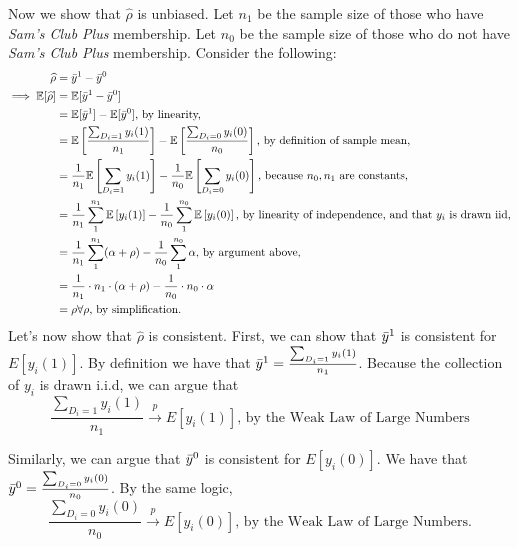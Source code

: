 \documentclass{article}
\newcommand{\E}{\mathbb{E}}
\begin{document}
\begin{enumerate}[label=\textbf{Q\arabic{enumi}}.,ref=Q\arabic{enumi}, wide=0pt, itemsep=1em, topsep=5pt]
\begin{enumerate}
\begin{solution}
{            Now we show that $\widehat{\rho}$ is unbiased. Let $n_1$ be the sample size of those who have \textit{Sam's Club Plus} membership. Let $n_0$ be the sample size of those who do not have \textit{Sam's Club Plus} membership. Consider the following:
            \begin{align*}
                \widehat{\rho} &= \Bar{y}^1 - \Bar{y}^0\\
                \implies \E[\widehat{\rho}] &= \E[\Bar{y}^1 - \Bar{y}^0] \\ 
                &= \E[\Bar{y}^1] - \E[\Bar{y}^0] \text{, by linearity, }\\
                &= \E\left[\frac{\sum_{D_i=1} y_i(1)}{n_1}\right] - \E\left[\frac{\sum_{D_i=0} y_i(0)}{n_0}\right] \text{, by definition of sample mean, }\\ 
                &= \frac{1}{n_1}\E\left[\sum_{D_i=1} y_i(1)\right] - \frac{1}{n_0}\E\left[\sum_{D_i=0} y_i(0)\right] \text{, because $n_0, n_1$ are constants, }\\ 
                &= \frac{1}{n_1}\sum_{1}^{n_1}\E\left[y_i(1)\right] - \frac{1}{n_0}\sum_{1}^{n_0}\E\left[y_i(0)\right] \text{, by linearity of independence, and that $y_i$ is drawn iid,}\\ 
                &= \frac{1}{n_1}\sum_{1}^{n_1} (\alpha + \rho) - \frac{1}{n_0}\sum_{1}^{n_0} \alpha \text{, by argument above, }\\ 
                &= \frac{1}{n_1}\cdot n_1 \cdot (\alpha + \rho) - \frac{1}{n_0} \cdot n_0 \cdot \alpha \\ 
                &= \rho \forall \rho \text{, by simplification}.
            \end{align*}
            \newpage
            Let's now show that $\hat{\rho}$ is consistent. 
            First, we can show that $\Bar{y}^1$ is consistent for $E[y_i(1)]$. By definition we have that $\Bar{y}^1 = \frac{\sum_{D_i=1} y_i(1)}{n_1}$. Because the collection of $y_i$ is drawn i.i.d, we can argue that 
            $$\frac{\sum_{D_i=1} y_i(1)}{n_1} \xrightarrow{p} E[y_i(1)] \text{, by the Weak Law of Large Numbers}$$
            
            Similarly, we can argue that $\Bar{y}^0$ is consistent for $E[y_i(0)]$. We have that $\Bar{y}^0 = \frac{\sum_{D_i=0} y_i(0)}{n_0}$. By the same logic, 
                 $$ \frac{\sum_{D_i=0} y_i(0)}{n_0} \xrightarrow{p} E[y_i(0)] \text{, by the Weak Law of Large Numbers.}$$ 
            
}
\end{solution}
\end{enumerate}
\end{enumerate}
\end{document}
